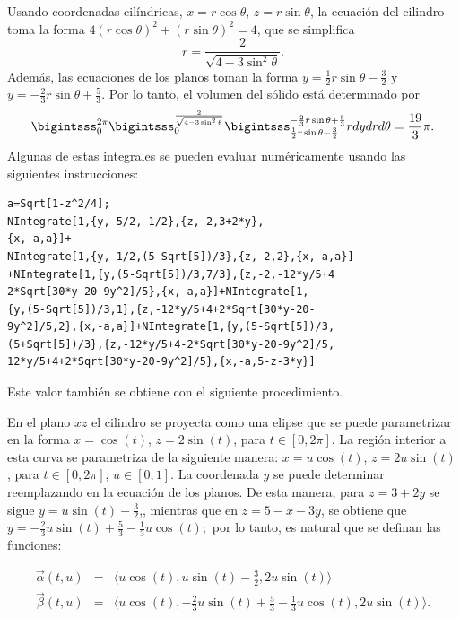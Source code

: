 Usando coordenadas cilíndricas, $x=r\cos \theta $, $z=r\sin \theta $, la ecuación del cilindro toma la forma
$4( r\cos \theta ) ^2+( r\sin \theta ) ^2=4$, que se simplifica
%
{\small
\[r=\frac{2}{\sqrt{4-3\sin ^2\theta }}.\]
}
%
Además, las ecuaciones de los planos toman la forma
$y=\frac{1}{2}r\sin \theta -\frac{3}{2}$ y
$y=-\frac{2}{3}r\sin \theta +\frac{5}{3}$.
Por lo tanto, el volumen del sólido está determinado por
\[\bigintsss_{0}^{2\pi }\bigintsss_{0}^{\frac{2}{\sqrt{4-3\sin ^2\theta }}}\bigintsss_{\frac{1}{2}r\sin \theta -\frac{3}{2}}^{-\frac{2}{3}r\sin\theta +\frac{5}{3}}rdydrd\theta = \frac{19}{3}\pi.\]
%
Algunas de estas integrales se pueden evaluar numéricamente usando las siguientes instrucciones:

\begin{tcolorbox}[title=\bf Instrucción en \verb"Mathematica"]\begin{Verbatim}[formatcom=\letraverbatim]
a=Sqrt[1-z^2/4];
NIntegrate[1,{y,-5/2,-1/2},{z,-2,3+2*y},
{x,-a,a}]+
NIntegrate[1,{y,-1/2,(5-Sqrt[5])/3},{z,-2,2},{x,-a,a}]
+NIntegrate[1,{y,(5-Sqrt[5])/3,7/3},{z,-2,-12*y/5+4
2*Sqrt[30*y-20-9y^2]/5},{x,-a,a}]+NIntegrate[1,
{y,(5-Sqrt[5])/3,1},{z,-12*y/5+4+2*Sqrt[30*y-20-
9y^2]/5,2},{x,-a,a}]+NIntegrate[1,{y,(5-Sqrt[5])/3,
(5+Sqrt[5])/3},{z,-12*y/5+4-2*Sqrt[30*y-20-9y^2]/5,
12*y/5+4+2*Sqrt[30*y-20-9y^2]/5},{x,-a,5-z-3*y}]
\end{Verbatim}
\end{tcolorbox}

Este valor también se obtiene con el siguiente procedimiento.


En el plano $xz$ el cilindro se proyecta como una elipse que se puede parametrizar en la forma
$x=\cos(t)$, $z=2\sin (t)$, para $t\in [0,2\pi ]$.
La región interior a esta curva se parametriza de la siguiente manera: $x = u \cos(t)$, $z = 2u\sin(t)$, para
$t\in[0, 2\pi]$, $u\in[0, 1]$. La coordenada $y$ se puede determinar reemplazando en la ecuación de los planos.
De esta manera, para $z=3+2y$ se sigue $y = u\sin(t)-\frac{3}{2}$,, mientras que en
$z = 5-x-3y$, se obtiene que $y = -\frac{2}{3}u\sin(t)+\frac{5}{3}-\frac{1}{3}u \cos(t);$ por lo tanto, es natural que se definan las funciones:

{\small
\begin{eqnarray*}
\overrightarrow{\alpha}(t,u)&=&\langle u \cos(t), u\sin(t)-\frac{3}{2},2u\sin(t)\rangle \\
\overrightarrow{\beta}(t,u) &=& \langle u \cos(t),-\frac{2}{3}u\sin(t)+\frac{5}{3}-\frac{1}{3}u \cos(t) ,2u\sin(t)\rangle.
\end{eqnarray*}
}
%

